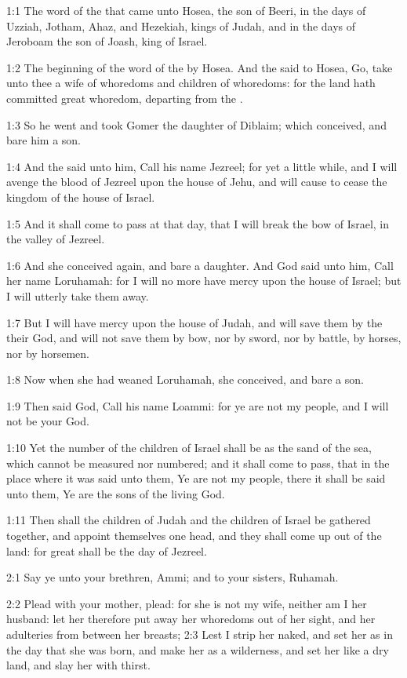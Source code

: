 

1:1 The word of the \LORD that came unto Hosea, the son of Beeri, in the days of Uzziah, Jotham, Ahaz, and Hezekiah, kings of Judah, and in the days of Jeroboam the son of Joash, king of Israel.

1:2 The beginning of the word of the \LORD by Hosea. And the \LORD said to Hosea, Go, take unto thee a wife of whoredoms and children of whoredoms: for the land hath committed great whoredom, departing from the \LORD.

1:3 So he went and took Gomer the daughter of Diblaim; which conceived, and bare him a son.

1:4 And the \LORD said unto him, Call his name Jezreel; for yet a little while, and I will avenge the blood of Jezreel upon the house of Jehu, and will cause to cease the kingdom of the house of Israel.

1:5 And it shall come to pass at that day, that I will break the bow of Israel, in the valley of Jezreel.

1:6 And she conceived again, and bare a daughter. And God said unto him, Call her name Loruhamah: for I will no more have mercy upon the house of Israel; but I will utterly take them away.

1:7 But I will have mercy upon the house of Judah, and will save them by the \LORD their God, and will not save them by bow, nor by sword, nor by battle, by horses, nor by horsemen.

1:8 Now when she had weaned Loruhamah, she conceived, and bare a son.

1:9 Then said God, Call his name Loammi: for ye are not my people, and I will not be your God.

1:10 Yet the number of the children of Israel shall be as the sand of the sea, which cannot be measured nor numbered; and it shall come to pass, that in the place where it was said unto them, Ye are not my people, there it shall be said unto them, Ye are the sons of the living God.

1:11 Then shall the children of Judah and the children of Israel be gathered together, and appoint themselves one head, and they shall come up out of the land: for great shall be the day of Jezreel.

2:1 Say ye unto your brethren, Ammi; and to your sisters, Ruhamah.

2:2 Plead with your mother, plead: for she is not my wife, neither am I her husband: let her therefore put away her whoredoms out of her sight, and her adulteries from between her breasts; 2:3 Lest I strip her naked, and set her as in the day that she was born, and make her as a wilderness, and set her like a dry land, and slay her with thirst.


